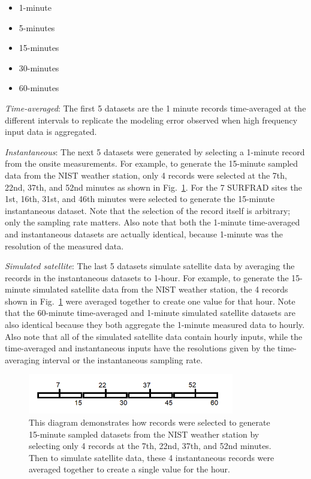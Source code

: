 \documentclass[conference]{IEEEtran}
\begin{document}
\begin{itemize}
    \item 1-minute
    \item 5-minutes
    \item 15-minutes
    \item 30-minutes
    \item 60-minutes
\end{itemize}

\emph{Time-averaged}: The first 5 datasets are the 1 minute records time-averaged at the different intervals to replicate the modeling error observed when high frequency input data is aggregated.

\emph{Instantaneous}: The next 5 datasets were generated by selecting a 1-minute record from the onsite measurements. For example, to generate the 15-minute sampled data from the NIST weather station, only 4 records were selected at the 7th, 22nd, 37th, and 52nd minutes as shown in Fig.~\ref{fig:sampling-diagram}. For the 7 SURFRAD sites the 1st, 16th, 31st, and 46th minutes were selected to generate the 15-minute instantaneous dataset. Note that the selection of the record itself is arbitrary; only the sampling rate matters. Also note that both the 1-minute time-averaged and instantaneous datasets are actually identical, because 1-minute was the resolution of the measured data.

\emph{Simulated satellite}: The last 5 datasets simulate satellite data by averaging the records in the instantaneous datasets to 1-hour. For example, to generate the 15-minute simulated satellite data from the NIST weather station, the 4 records shown in Fig.~\ref{fig:sampling-diagram} were averaged together to create one value for that hour. Note that the 60-minute time-averaged and 1-minute simulated satellite datasets are also identical because they both aggregate the 1-minute measured data to hourly. Also note that all of the simulated satellite data contain hourly inputs, while the time-averaged and instantaneous inputs have the resolutions given by the time-averaging interval or the instantaneous sampling rate.

\begin{figure}[htbp]
\centerline{\includegraphics[width=9cm]{sampling-diagram.png}}
\caption{This diagram demonstrates how records were selected to generate 15-minute sampled datasets from the NIST weather station by selecting only 4 records at the 7th, 22nd, 37th, and 52nd minutes. Then to simulate satellite data, these 4 instantaneous records were averaged together to create a single value for the hour.}
\label{fig:sampling-diagram}
\end{figure}
\end{document}
